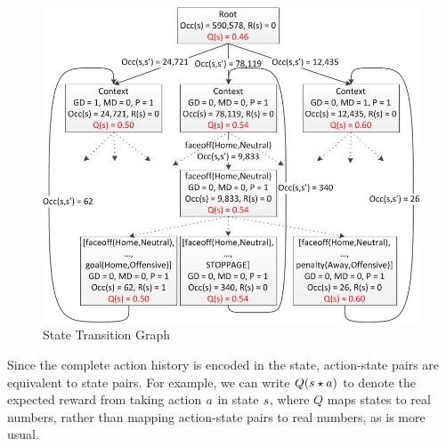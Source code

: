 \documentclass[]{article}
\begin{document}
\begin{figure}[ht]
\includegraphics[width = 1.0\columnwidth]{sample_state_transition_graph2}
\caption{State Transition Graph}
\label{fig:state-transition-graph}
\end{figure}

Since the complete action history is encoded in the state, action-state pairs are equivalent to state pairs.
For example, we can write $Q(s \star a)$ to denote the expected reward from taking action $a$ in state $s$, where $Q$ maps states to real numbers, rather than mapping action-state pairs to real numbers, as is more usual.



%
%
%
\end{document}
